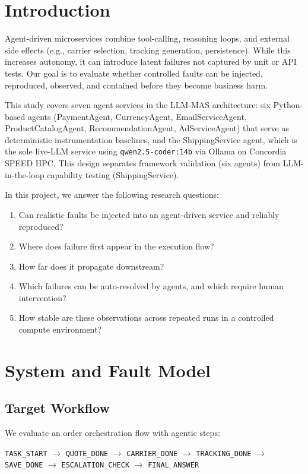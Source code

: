 \documentclass[conference]{IEEEtran}
\begin{document}
\section{Introduction}

Agent-driven microservices combine tool-calling, reasoning loops, and external
side effects (e.g., carrier selection, tracking generation, persistence). While
this increases autonomy, it can introduce latent failures not captured by unit
or API tests. Our goal is to evaluate whether controlled faults can be injected,
reproduced, observed, and contained before they become business harm.

This study covers seven agent services in the LLM-MAS architecture: six
Python-based agents (PaymentAgent, CurrencyAgent, EmailServiceAgent,
ProductCatalogAgent, RecommendationAgent, AdServiceAgent) that serve as
deterministic instrumentation baselines, and the ShippingService agent, which
is the sole live-LLM service using \texttt{qwen2.5-coder:14b} via Ollama on
Concordia SPEED HPC. This design separates framework validation (six agents)
from LLM-in-the-loop capability testing (ShippingService).

In this project, we answer the following research questions:
\begin{enumerate}
  \item Can realistic faults be injected into an agent-driven service and
        reliably reproduced?
  \item Where does failure first appear in the execution flow?
  \item How far does it propagate downstream?
  \item Which failures can be auto-resolved by agents, and which require human
        intervention?
  \item How stable are these observations across repeated runs in a controlled
        compute environment?
\end{enumerate}

\section{System and Fault Model}

\subsection{Target Workflow}
We evaluate an order orchestration flow with agentic steps:
\begin{center}
\small
\texttt{TASK\_START} $\!\to\!$ \texttt{QUOTE\_DONE} $\!\to\!$ \texttt{CARRIER\_DONE}
$\!\to\!$ \texttt{TRACKING\_DONE} $\!\to\!$ \texttt{SAVE\_DONE}
$\!\to\!$ \texttt{ESCALATION\_CHECK} $\!\to\!$ \texttt{FINAL\_ANSWER}
\end{center}
\end{document}
